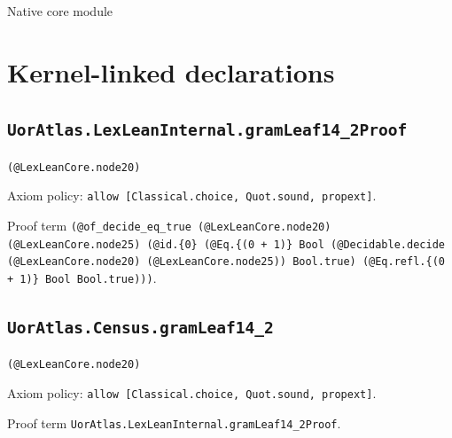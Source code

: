 \documentclass[11pt]{article}
\begin{document}
\begin{center}{\LARGE Native core module}\end{center}
\section*{Kernel-linked declarations}
\subsection*{\texttt{UorAtlas.LexLeanInternal.gramLeaf14\_2Proof}}
\noindent\texttt{(@LexLeanCore.node20)}\par
\noindent Axiom policy: \texttt{allow [Classical.choice, Quot.sound, propext]}.\par
\noindent Proof term \texttt{(@of\_decide\_eq\_true (@LexLeanCore.node20) (@LexLeanCore.node25) (@id.\{0\} (@Eq.\{(0 + 1)\} Bool (@Decidable.decide (@LexLeanCore.node20) (@LexLeanCore.node25)) Bool.true) (@Eq.refl.\{(0 + 1)\} Bool Bool.true)))}.\par
\subsection*{\texttt{UorAtlas.Census.gramLeaf14\_2}}
\noindent\texttt{(@LexLeanCore.node20)}\par
\noindent Axiom policy: \texttt{allow [Classical.choice, Quot.sound, propext]}.\par
\noindent Proof term \texttt{UorAtlas.LexLeanInternal.gramLeaf14\_2Proof}.\par
\end{document}
